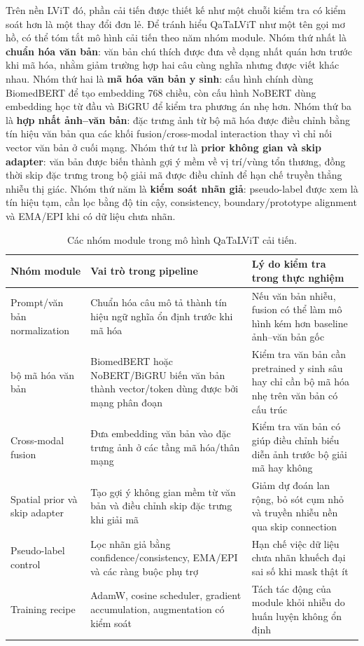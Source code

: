 Trên nền LViT đó, phần cải tiến được thiết kế như một chuỗi kiểm tra có kiểm soát hơn là một thay đổi đơn lẻ. Để tránh hiểu QaTaLViT như một tên gọi mơ hồ, có thể tóm tắt mô hình cải tiến theo năm nhóm module. Nhóm thứ nhất là \textbf{chuẩn hóa văn bản}: văn bản chú thích được đưa về dạng nhất quán hơn trước khi mã hóa, nhằm giảm trường hợp hai câu cùng nghĩa nhưng được viết khác nhau. Nhóm thứ hai là \textbf{mã hóa văn bản y sinh}: cấu hình chính dùng BiomedBERT để tạo embedding 768 chiều, còn cấu hình NoBERT dùng embedding học từ đầu và BiGRU để kiểm tra phương án nhẹ hơn. Nhóm thứ ba là \textbf{hợp nhất ảnh--văn bản}: đặc trưng ảnh từ bộ mã hóa được điều chỉnh bằng tín hiệu văn bản qua các khối fusion/cross-modal interaction thay vì chỉ nối vector văn bản ở cuối mạng. Nhóm thứ tư là \textbf{prior không gian và skip adapter}: văn bản được biến thành gợi ý mềm về vị trí/vùng tổn thương, đồng thời skip đặc trưng trong bộ giải mã được điều chỉnh để hạn chế truyền thẳng nhiễu thị giác. Nhóm thứ năm là \textbf{kiểm soát nhãn giả}: pseudo-label được xem là tín hiệu tạm, cần lọc bằng độ tin cậy, consistency, boundary/prototype alignment và EMA/EPI khi có dữ liệu chưa nhãn.

\begin{table}[H]
  \centering
  \caption{Các nhóm module trong mô hình QaTaLViT cải tiến.}
  \label{tab:qatalvit-module-summary}
  \small
  \renewcommand{\arraystretch}{1.15}
  \setlength{\tabcolsep}{4pt}
  \begin{tabularx}{\textwidth}{@{}p{} Y Y@{}}
    \toprule
    Nhóm module & Vai trò trong pipeline & Lý do kiểm tra trong thực nghiệm \\
    \midrule
    Prompt/văn bản normalization & Chuẩn hóa câu mô tả thành tín hiệu ngữ nghĩa ổn định trước khi mã hóa & Nếu văn bản nhiễu, fusion có thể làm mô hình kém hơn baseline ảnh--văn bản gốc \\
    bộ mã hóa văn bản & BiomedBERT hoặc NoBERT/BiGRU biến văn bản thành vector/token dùng được bởi mạng phân đoạn & Kiểm tra văn bản cần pretrained y sinh sâu hay chỉ cần bộ mã hóa nhẹ trên văn bản có cấu trúc \\
    Cross-modal fusion & Đưa embedding văn bản vào đặc trưng ảnh ở các tầng mã hóa/thân mạng & Kiểm tra văn bản có giúp điều chỉnh biểu diễn ảnh trước bộ giải mã hay không \\
    Spatial prior và skip adapter & Tạo gợi ý không gian mềm từ văn bản và điều chỉnh skip đặc trưng khi giải mã & Giảm dự đoán lan rộng, bỏ sót cụm nhỏ và truyền nhiễu nền qua skip connection \\
    Pseudo-label control & Lọc nhãn giả bằng confidence/consistency, EMA/EPI và các ràng buộc phụ trợ & Hạn chế việc dữ liệu chưa nhãn khuếch đại sai số khi mask thật ít \\
    Training recipe & AdamW, cosine scheduler, gradient accumulation, augmentation có kiểm soát & Tách tác động của module khỏi nhiễu do huấn luyện không ổn định \\
    \bottomrule
  \end{tabularx}
\end{table}
\FloatBarrier

